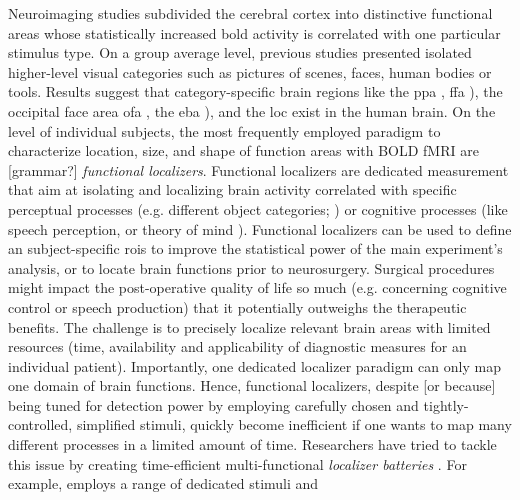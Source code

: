 Neuroimaging studies subdivided the cerebral cortex into
distinctive functional areas whose statistically increased \ac{bold} activity is
correlated with one particular stimulus type.
On a group average level, previous studies presented isolated higher-level
visual categories such as pictures of scenes, faces, human bodies or tools.
Results suggest that category-specific brain regions like the \ac{ppa}
\citep{epstein1998ppa}, \ac{ffa} \citep{kanwisher1997ffa}), the occipital face
area \ac{ofa} \citep{pitcher2011occipitalfacearea}, the \ac{eba}
\citep{downing2001bodyarea}), and the \ac{loc} \citet{malach1995loc} exist in
the human brain.
On the level of individual subjects, the most frequently employed paradigm to
characterize location, size, and shape of function areas with BOLD fMRI are
[grammar?] \textit{functional localizers}.
Functional localizers are dedicated measurement that aim at isolating and
localizing brain activity correlated with specific perceptual processes (e.g.
different object categories; \citet{kanwisher1997ffa}) or cognitive processes
(like speech perception, \citet{fernandez2001language} or theory of mind
\citet{spunt2014validating}).
Functional localizers can be used to define an subject-specific \acp{roi} to
improve the statistical power of the main experiment's analysis, or to locate
brain functions prior to neurosurgery.
Surgical procedures might impact the post-operative quality of life so much
(e.g. concerning cognitive control or speech production) that it potentially
outweighs the therapeutic benefits.
The challenge is to precisely localize relevant brain areas with limited
resources (time, availability and applicability of diagnostic measures for an
individual patient).
Importantly, one dedicated localizer paradigm can only map one domain of brain
functions.
Hence, functional localizers, despite [or because] being tuned for detection
power by employing carefully chosen and tightly-controlled, simplified stimuli,
quickly become inefficient if one wants to map many different processes in a
limited amount of time.
Researchers have tried to tackle this issue by creating time-efficient
multi-functional \textit{localizer batteries} \citep{barch2013function,
drobyshevsky2006rapid, pinel2007fast}.
For example, \citet{pinel2007fast} employs a range of dedicated stimuli and
